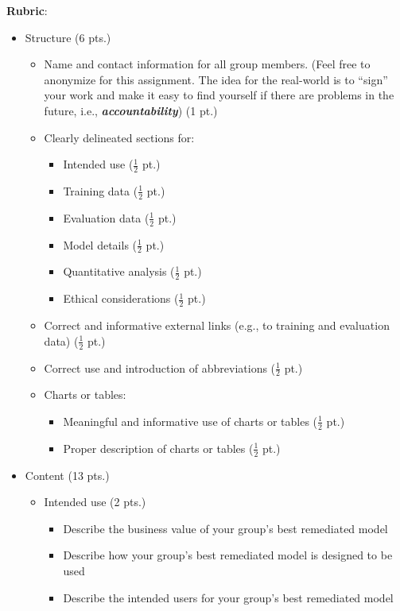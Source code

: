 \documentclass[fleqn]{article}
\begin{document}
\noindent \textbf{Rubric}:

\begin{itemize}
	\item Structure (6 pts.)
	\begin{itemize}
		\item Name and contact information for all group members. (Feel free to anonymize for this assignment. The idea for the real-world is to ``sign'' your work and make it easy to find yourself if there are problems in the future, i.e., \textbf{\textit{accountability}}) (1 pt.) 
		\item Clearly delineated sections for:
		\begin{itemize}
			\item Intended use ($\frac{1}{2}$ pt.)
			\item Training data ($\frac{1}{2}$ pt.)
			\item Evaluation data ($\frac{1}{2}$ pt.)
			\item Model details ($\frac{1}{2}$ pt.)
			\item Quantitative analysis ($\frac{1}{2}$ pt.)
			\item Ethical considerations ($\frac{1}{2}$ pt.)
		\end{itemize}
		\item Correct and informative external links (e.g., to training and evaluation data) ($\frac{1}{2}$ pt.)
		\item Correct use and introduction of abbreviations ($\frac{1}{2}$ pt.)
		\item Charts or tables:
		\begin{itemize}
			\item Meaningful and informative use of charts or tables ($\frac{1}{2}$ pt.)
			\item Proper description of charts or tables ($\frac{1}{2}$ pt.)
		\end{itemize}
	\end{itemize}
	\item Content (13 pts.)
	\begin{itemize}
		\item Intended use (2 pts.)
		\begin{itemize}
			\item Describe the business value of your group's best remediated model
			\item Describe how your group's best remediated model is designed to be used
			\item Describe the intended users for your group's best remediated model

\end{itemize}
\end{itemize}
\end{itemize}
\end{document}
